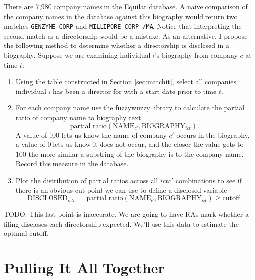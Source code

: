 \documentclass{article}
\newcommand{\1}{\mathds{1}}
\begin{document}
There are 7,980 company names in the Equilar database. A naive
comparison of the company names in the database against this biography
would return two matches \texttt{GENZYME CORP} and
\texttt{MILLIPORE CORP /MA}. Notice that interpreting the second match
as a directorship would be a mistake. As an alternative, I propose the
following method to determine whether a directorship is disclosed in a
biography. Suppose we are examining individual $i$'s biography from
company $c$ at time $t$:
\begin{enumerate}
\item Using the table constructed in Section \ref{sec:matchit}, select
  all companies individual $i$ has been a director for with a start
  date prior to time $t$.
\item For each company name use the fuzzywuzzy library to
  calculate the partial ratio of company name to biography text
\[
\text{partial\_ratio}(\text{NAME}_{c'}, \text{BIOGRAPHY}_{ict}).
\]
A value of 100 lets us know the name of company $c'$ occurs in the
biography, a value of 0 lets us know it does not occur, and the closer
the value gets to 100 the more similar a substring of the biography is
to the company name. Record this measure in the database.
\item Plot the distribution of partial ratios across all $ictc'$
  combinations to see if there is an obvious cut point we can use to
  define a disclosed variable
\[
\text{DISCLOSED}_{ictc'} = \text{partial\_ratio}(\text{NAME}_{c'},
\text{BIOGRAPHY}_{ict}) \ge \text{cutoff}.
\]
\end{enumerate}

TODO: This last point is inaccurate. We are going to have RAs mark
whether a filing discloses each directorship expected. We'll use this
data to estimate the optimal cutoff.


\section{Pulling It All Together}
\end{document}
